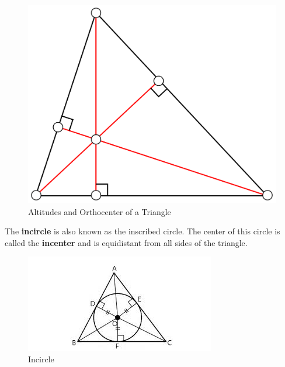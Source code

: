 \documentclass{article}
\begin{document}
            \begin{figure} [hbt!]
                \centering
                \includegraphics[scale = 0.08] {Resources/Unit2Triangles/orthocenter.PNG}
                \caption*{Altitudes and Orthocenter of a Triangle}
            \end{figure}

            \noindent The \textbf{incircle} is also known as the inscribed circle. The center of
            this circle is called the \textbf{incenter} and is equidistant from all sides of the
            triangle. \\

            \begin{figure} [hbt!]
                \centering
                \includegraphics[scale = 0.75] {Resources/Unit2Triangles/incircle.jpg}
                \caption*{Incircle}
            \end{figure}
\end{document}
